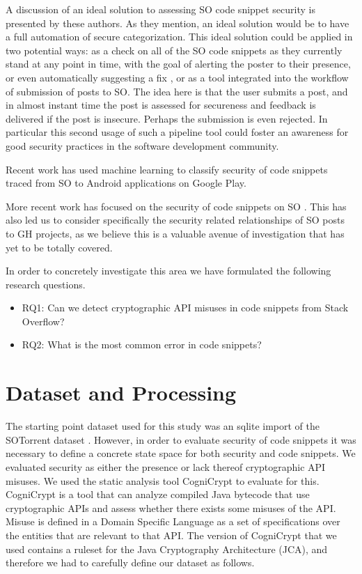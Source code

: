 \documentclass[10pt, conference]{IEEEtran}
\begin{document}
A discussion of an ideal solution to assessing SO code snippet security is presented by these authors. As they mention, an ideal solution would be to have a full automation of secure categorization. This ideal solution could be applied in two potential ways: as a check on all of the SO code snippets as they currently stand at any point in time, with the goal of alerting the poster to their presence, or even automatically suggesting a fix , or as a tool integrated into the workflow of submission of posts to SO. The idea here is that the user submits a post, and in almost instant time the post is assessed for secureness and feedback is delivered if the post is insecure. Perhaps the submission is even rejected. In particular this second usage of such a pipeline tool could foster an awareness for good security practices in the software development community.

 Recent work \cite{7958574} has used machine learning to classify security of code snippets traced from SO to Android applications on Google Play. 
 
 More recent work has focused on the security of code snippets on SO \cite{DBLP:journals/corr/abs-1901-01327}. This has also led us to consider specifically the security related relationships of SO posts to GH projects, as we believe this is a valuable avenue of investigation that has yet to be totally covered.

In order to concretely investigate this area we have formulated the following research questions.


\begin{itemize}
\item  RQ1: Can we detect cryptographic API misuses in code snippets from Stack Overflow?

\item  RQ2: What is the most common error in code snippets?


\end{itemize}



\section{Dataset and Processing}

The starting point dataset used for this study was an sqlite import of the SOTorrent dataset \cite{wong_2019}. However, in order to evaluate security of code snippets it was necessary to define a concrete state space for both security and code snippets. We evaluated security as either the presence or lack thereof cryptographic API misuses. We used the static analysis tool CogniCrypt \cite{krger_et_al:LIPIcs:2018:9215} to evaluate for this. CogniCrypt is a tool that can analyze compiled Java bytecode that use cryptographic APIs and assess whether there exists some misuses of the API. Misuse is defined in a Domain Specific Language as a set of specifications over the entities that are relevant to that API. The version of CogniCrypt that we used contains a ruleset for the Java Cryptography Architecture (JCA), and therefore we had to carefully define our dataset as follows.
\end{document}
